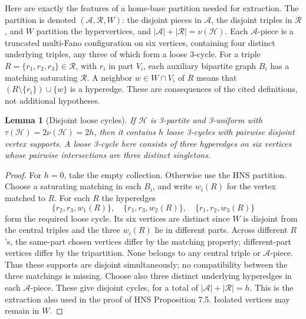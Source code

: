\documentclass[11pt]{article}
\newtheorem{lemma}[theorem]{Lemma}
\begin{document}
Here are exactly the features of a home-base partition needed for extraction.
The partition is denoted $(\mathcal A,\mathcal R,W)$: the disjoint pieces
in $\mathcal A$, the disjoint triples in $\mathcal R$, and $W$ partition
the hypervertices, and $|\mathcal A|+|\mathcal R|=\nu(\mathcal H)$.
Each $\mathcal A$-piece is a truncated multi-Fano configuration on six
vertices, containing four distinct underlying triples, any three of which
form a loose 3-cycle. For a triple $R=\{r_1,r_2,r_3\}\in\mathcal R$,
with $r_i$ in part $V_i$, each auxiliary bipartite graph $B_i$ has a
matching saturating $\mathcal R$. A neighbor $w\in W\cap V_i$ of $R$
means that $(R\setminus\{r_i\})\cup\{w\}$ is a hyperedge.
These are consequences of the cited definitions, not additional hypotheses.

\begin{lemma}[Disjoint loose cycles]\label{lem:cycles}
If $\mathcal H$ is 3-partite and 3-uniform with
$\tau(\mathcal H)=2\nu(\mathcal H)=2h$, then it contains $h$ loose
3-cycles with pairwise disjoint vertex supports. A loose 3-cycle here consists
of three hyperedges on six vertices whose pairwise intersections are three
distinct singletons.
\end{lemma}
\begin{proof}
For $h=0$, take the empty collection. Otherwise use the HNS partition.
Choose a saturating matching in each $B_i$, and write $w_i(R)$ for the
vertex matched to $R$. For each $R$ the hyperedges
\begin{equation}\label{eq:cycles}
\{r_2,r_3,w_1(R)\},\quad
\{r_1,r_3,w_2(R)\},\quad
\{r_1,r_2,w_3(R)\}
\end{equation}
form the required loose cycle. Its six vertices are distinct since
$W$ is disjoint from the central triples and the three $w_i(R)$ lie in
different parts. Across different $R$'s, the same-part chosen vertices
differ by the matching property; different-part vertices differ by the
tripartition. None belongs to any central triple or $\mathcal A$-piece.
Thus these supports are disjoint simultaneously; no compatibility between
the three matchings is missing. Choose also three distinct underlying
hyperedges in each $\mathcal A$-piece. These give disjoint cycles, for a
total of $|\mathcal A|+|\mathcal R|=h$. This is the extraction also used
in the proof of HNS Proposition 7.5. Isolated vertices may remain in $W$.
\end{proof}
\end{document}
